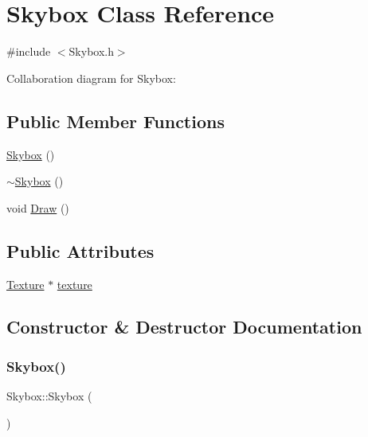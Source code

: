 \hypertarget{class_skybox}{}\section{Skybox Class Reference}
\label{class_skybox}


{\ttfamily \#include $<$Skybox.\+h$>$}



Collaboration diagram for Skybox\+:
\subsection*{Public Member Functions}
\begin{DoxyCompactItemize}
\item 
\mbox{\hyperlink{class_skybox_a77a92db4492ed94ed4bd101b05ffb1f4}{Skybox}} ()
\item 
\mbox{\hyperlink{class_skybox_a62ad4c6b4b1965a0a6d8536a50d4c090}{$\sim$\+Skybox}} ()
\item 
void \mbox{\hyperlink{class_skybox_a8bf85652e4f0559530eb7a1f5ed87439}{Draw}} ()
\end{DoxyCompactItemize}
\subsection*{Public Attributes}
\begin{DoxyCompactItemize}
\item 
\mbox{\hyperlink{class_texture}{Texture}} $\ast$ \mbox{\hyperlink{class_skybox_a6e1ace9b3bcf2c50136a833d2a1d2118}{texture}}
\end{DoxyCompactItemize}


\subsection{Constructor \& Destructor Documentation}
\mbox{\label{class_skybox_a77a92db4492ed94ed4bd101b05ffb1f4}} 
\subsubsection{\texorpdfstring{Skybox()}{Skybox()}}
{\footnotesize\ttfamily Skybox\+::\+Skybox (\begin{DoxyParamCaption}{ }\end{DoxyParamCaption})}

\mbox{\label{class_skybox_a62ad4c6b4b1965a0a6d8536a50d4c090}} 
